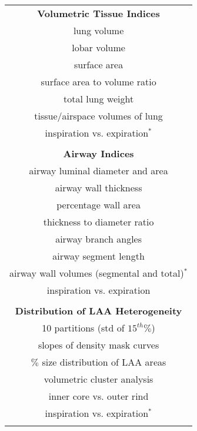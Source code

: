 
\begin{table}[!t]
  \small
  \begin{minipage}{0.33 \linewidth}
   \vspace{2mm}
   \centering
    \begin{tabular}[t]{c}
    {\bf Volumetric Tissue Indices}  \\
    \cmidrule[1pt](lr){1-1}
    lung volume   \\
    lobar volume  \\
    surface area  \\
    surface area to volume ratio  \\
    total lung weight  \\
    tissue/airspace volumes of lung \\
    inspiration vs. expiration$^*$ \\
    \\
    {\bf Airway Indices} \\
    \cmidrule[1pt](lr){1-1}
    airway luminal diameter and area  \\
    airway wall thickness  \\
    percentage wall area   \\
    thickness to diameter ratio  \\
    airway branch angles  \\
    airway segment length  \\
    airway wall volumes (segmental and total)$^*$ \\
    inspiration vs. expiration  \\
    \\
    {\bf Distribution of LAA Heterogeneity}  \\
    \cmidrule[1pt](lr){1-1}
    10 partitions (std of $15^{th} \%$)  \\
    slopes of density mask curves  \\
    $\%$ size distribution of LAA areas \\
    volumetric cluster analysis \\
    inner core vs. outer rind \\
    inspiration vs. expiration$^*$ \\
    \\
   \end{tabular}
   \end{minipage}
  \hspace{0cm}
  \begin{minipage}{0.33 \linewidth}
   \vspace{-8mm}

\end{minipage}
\end{table}

